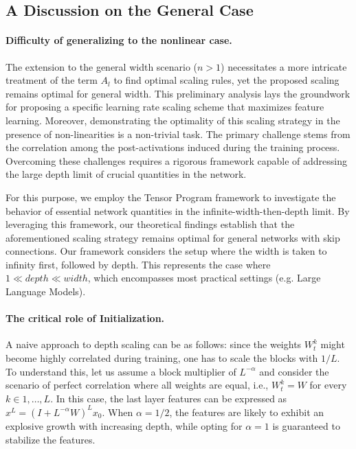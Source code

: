 \documentclass{article}
\theoremstyle{plain}
\theoremstyle{definition}
\begin{document}
\subsection{A Discussion on the General Case}
\paragraph{Difficulty of generalizing to the nonlinear case. } The extension to the general width scenario ($n > 1$) necessitates a more intricate treatment of the term $A_l$ to find optimal scaling rules, yet the proposed scaling remains optimal for general width. This preliminary analysis lays the groundwork for proposing a specific learning rate scaling scheme that maximizes feature learning. Moreover, demonstrating the optimality of this scaling strategy in the presence of non-linearities is a non-trivial task. The primary challenge stems from the correlation among the post-activations induced during the training process.  Overcoming these challenges requires a rigorous framework capable of addressing the large depth limit of crucial quantities in the network.

For this purpose, we employ the Tensor Program framework to investigate the behavior of essential network quantities in the infinite-width-then-depth limit. By leveraging this framework, our theoretical findings establish that the aforementioned scaling strategy remains optimal for general networks with skip connections. Our framework considers the setup where the width is taken to infinity first, followed by depth. This represents the case where $1 \ll depth \ll width$, which encompasses most practical settings (e.g. Large Language Models).

\paragraph{The critical role of  Initialization.} A naive approach to depth scaling can be as follows: since the weights $W^k_t$ might become highly correlated during training, one has to scale the blocks with $1/L$. To understand this, let us assume a block multiplier of $L^{-\alpha}$ and consider the scenario of perfect correlation where all weights are equal, i.e., $W^k_t = W$ for every $k \in {1, \dots, L}$. In this case, the last layer features can be expressed as $x^L = \left( I + L^{-\alpha} W\right)^L x_0$. When $\alpha = 1/2$, the features are likely to exhibit an explosive growth with increasing depth, while opting for $\alpha=1$ is guaranteed to stabilize the features.
\end{document}

